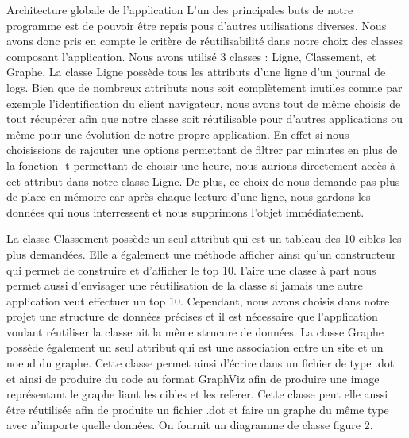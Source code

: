 \documentclass[11pt]{article}
\begin{document}
\begin{section}{Architecture globale de l'application}
L'un des principales buts de notre programme est de pouvoir être repris pous d'autres utilisations diverses. Nous avons donc pris en compte le critère de réutilisabilité dans notre choix des classes composant l'application.
Nous avons utilisé 3 classes : Ligne, Classement, et Graphe. 
La classe Ligne possède tous les attributs d'une ligne d'un journal de logs. Bien que de nombreux attributs nous soit complètement inutiles comme par exemple l'identification du client navigateur, nous avons tout de même choisis de tout récupérer afin que notre classe soit réutilisable pour d'autres applications ou même pour une évolution de notre propre application. En effet si nous choisissions de rajouter une options permettant de filtrer par minutes en plus de la fonction -t permettant de choisir une heure, nous aurions directement accès à cet attribut dans notre classe Ligne. De plus, ce choix de nous demande pas plus de place en mémoire car après chaque lecture d'une ligne, nous gardons les données qui nous interressent et nous supprimons l'objet immédiatement.

La classe Classement possède un seul attribut qui est un tableau des 10 cibles les plus demandées. Elle a également une méthode afficher ainsi qu'un constructeur qui permet de construire et d'afficher le top 10. Faire une classe à part nous permet aussi d'envisager une réutilisation de la classe si jamais une autre application veut effectuer un top 10. Cependant, nous avons choisis dans notre projet une structure de données précises et il est nécessaire que l'application voulant réutiliser la classe ait la même strucure de données.
La classe Graphe possède également un seul attribut qui est une association entre un site et un noeud du graphe. Cette classe permet ainsi d'écrire dans un fichier de type .dot et ainsi de produire du code au format GraphViz afin de produire une image représentant le graphe liant les cibles et les referer. Cette classe peut elle aussi être réutilisée afin de produite un fichier .dot et faire un graphe du même type avec n'importe quelle données.
On fournit un diagramme de classe figure 2.


\end{section}
\end{document}
